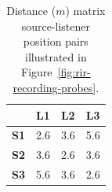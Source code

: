 \begin{table}[htb]
    \centering
    \caption[Ray tracing testing --- source-listener position distance matrix]{Distance ($m$) matrix source-listener position pairs illustrated in Figure~\ref{fig:rir-recording-probes}.}\label{tab:source-listener-distances}
    \begin{tabular}{@{}llll@{}}
    \toprule
       & \textbf{L1}  & \textbf{L2}  & \textbf{L3}  \\ \midrule
    \textbf{S1} & 2.6 & 3.6 & 5.6 \\
    \textbf{S2} & 3.6 & 2.6 & 3.6 \\
    \textbf{S3} & 5.6 & 3.6 & 2.6 \\ \bottomrule
    \end{tabular}
\end{table}